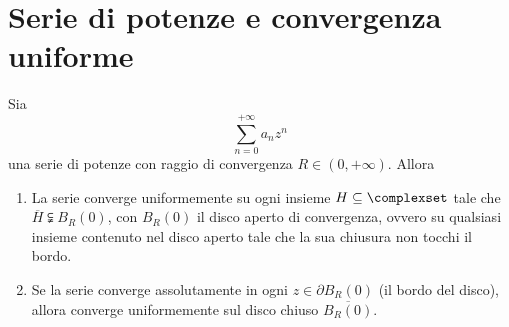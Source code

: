 \section{Serie di potenze e convergenza uniforme}
\begin{theorema}\label{convergenzasottoinsiemeH}
	Sia
	\begin{equation*}
		\sum_{n=0}^{+\infty}a_nz^n
	\end{equation*}
una serie di potenze con raggio di convergenza $R\in\left(0,+\infty\right)$. Allora
	\begin{enumerate}
		\item La serie converge uniformemente su ogni insieme $H\subseteq\complexset$ tale che $\overline{H}\subsetneqq B_R\left(0\right)$, con $B_R\left(0\right)$ il disco aperto di convergenza, ovvero su qualsiasi insieme contenuto nel disco aperto tale che la sua chiusura non tocchi il bordo.
		\item Se la serie converge assolutamente in ogni $z\in\partial B_R\left(0\right)$ (il bordo del disco), allora converge uniformemente sul disco chiuso $\overline{B_R\left(0\right)}$.
	\end{enumerate}
\end{theorema}
